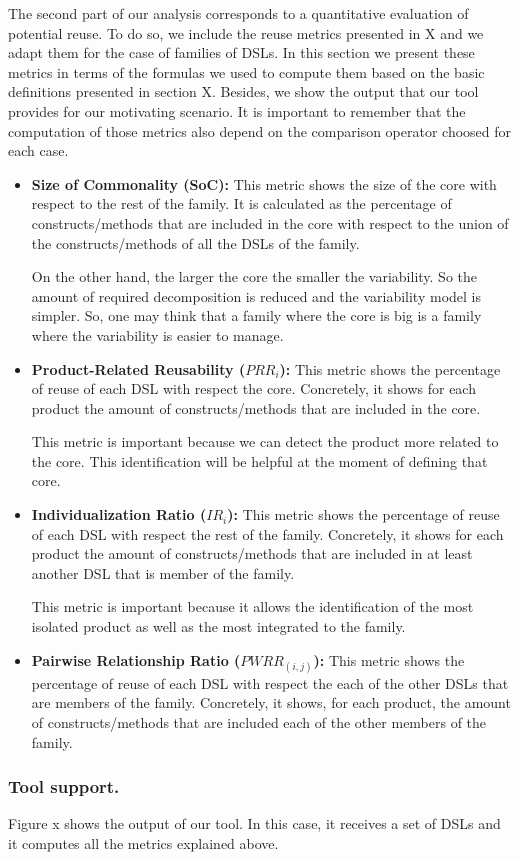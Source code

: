 The second part of our analysis corresponds to a quantitative evaluation of potential reuse. To do so, we include the reuse metrics presented in X and we adapt them for the case of families of DSLs. In this section we present these metrics in terms of the formulas we used to compute them based on the basic definitions presented in section X. Besides, we show the output that our tool provides for our motivating scenario. It is important to remember that the computation of those metrics also depend on the comparison operator choosed for each case. 

\begin{itemize}
\item \textbf{Size of Commonality (SoC):} This metric shows the size of the core with respect to the rest of the family. It is calculated as the percentage of constructs/methods that are included in the core with respect to the union of the constructs/methods of all the DSLs of the family. 

\hspace{3mm} On the other hand, the larger the core the smaller the variability. So the amount of required decomposition is reduced and the variability model is simpler. So, one may think that a family where the core is big is a family where the variability is easier to manage. 

\vspace{2mm}
\item \textbf{Product-Related Reusability ($PRR_i$):}
This metric shows the percentage of reuse of each DSL with respect the core. Concretely, it shows for each product the amount of constructs/methods that are included in the core.

\hspace{3mm} This metric is important because we can detect the product more related to the core. This identification will be helpful at the moment of defining that core. 

\vspace{2mm}
\item \textbf{Individualization Ratio ($IR_i$):}
This metric shows the percentage of reuse of each DSL with respect the rest of the family. Concretely, it shows for each product the amount of constructs/methods that are included in at least another DSL that is member of the family.

\hspace{3mm} This metric is important because it allows the identification of the most isolated product as well as the most integrated to the family.

\vspace{2mm}
\item \textbf{Pairwise Relationship Ratio ($PWRR_{(i,j)}$):} 
This metric shows the percentage of reuse of each DSL with respect the each of the other DSLs that are members of the family. Concretely, it shows, for each product, the amount of constructs/methods that are included each of the other members of the family.
\end{itemize}

\subsubsection{Tool support.} Figure x shows the output of our tool. In this case, it receives a set of DSLs and it computes all the metrics explained above. 
